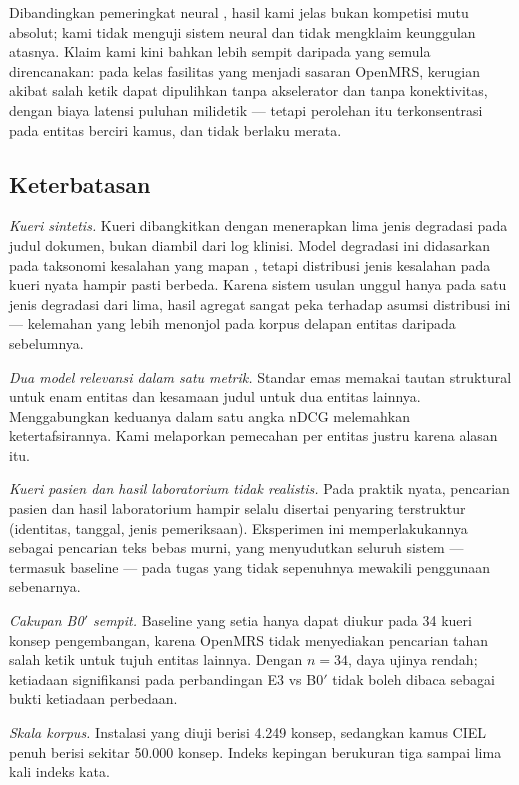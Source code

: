 \documentclass[journal,twoside,web]{ieeecolor}
\begin{document}
Dibandingkan pemeringkat neural \cite{lin2022, khattab2020, formal2021}, hasil
kami jelas bukan kompetisi mutu absolut; kami tidak menguji sistem neural dan
tidak mengklaim keunggulan atasnya. Klaim kami kini bahkan lebih sempit daripada
yang semula direncanakan: pada kelas fasilitas yang menjadi sasaran OpenMRS,
kerugian akibat salah ketik dapat dipulihkan tanpa akselerator dan tanpa
konektivitas, dengan biaya latensi puluhan milidetik --- tetapi perolehan itu
terkonsentrasi pada entitas berciri kamus, dan tidak berlaku merata.

\subsection{Keterbatasan}

\emph{Kueri sintetis.} Kueri dibangkitkan dengan menerapkan lima jenis degradasi
pada judul dokumen, bukan diambil dari log klinisi. Model degradasi ini
didasarkan pada taksonomi kesalahan yang mapan \cite{kukich1992, damerau1964},
tetapi distribusi jenis kesalahan pada kueri nyata hampir pasti berbeda. Karena
sistem usulan unggul hanya pada satu jenis degradasi dari lima, hasil agregat
sangat peka terhadap asumsi distribusi ini --- kelemahan yang lebih menonjol pada
korpus delapan entitas daripada sebelumnya.

\emph{Dua model relevansi dalam satu metrik.} Standar emas memakai tautan
struktural untuk enam entitas dan kesamaan judul untuk dua entitas lainnya.
Menggabungkan keduanya dalam satu angka nDCG melemahkan ketertafsirannya. Kami
melaporkan pemecahan per entitas justru karena alasan itu.

\emph{Kueri pasien dan hasil laboratorium tidak realistis.} Pada praktik nyata,
pencarian pasien dan hasil laboratorium hampir selalu disertai penyaring
terstruktur (identitas, tanggal, jenis pemeriksaan). Eksperimen ini
memperlakukannya sebagai pencarian teks bebas murni, yang menyudutkan seluruh
sistem --- termasuk baseline --- pada tugas yang tidak sepenuhnya mewakili
penggunaan sebenarnya.

\emph{Cakupan B0$'$ sempit.} Baseline yang setia hanya dapat diukur pada 34 kueri
konsep pengembangan, karena OpenMRS tidak menyediakan pencarian tahan salah ketik
untuk tujuh entitas lainnya. Dengan $n = 34$, daya ujinya rendah; ketiadaan
signifikansi pada perbandingan E3 vs B0$'$ tidak boleh dibaca sebagai bukti
ketiadaan perbedaan.

\emph{Skala korpus.} Instalasi yang diuji berisi 4.249 konsep, sedangkan kamus
CIEL penuh berisi sekitar 50.000 konsep. Indeks kepingan berukuran tiga sampai
lima kali indeks kata.
\end{document}
